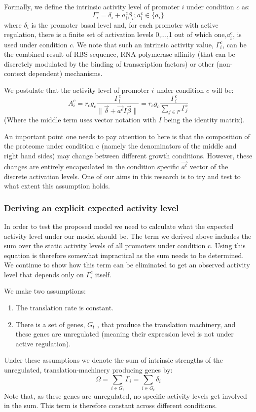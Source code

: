 \documentclass{report}
\providecommand{\norm}[1]{\lVert#1\rVert}
\begin{document}
Formally, we define the intrinsic activity level of promoter $i$ under condition $c$ as:
\[\Gamma^c_i=\delta_i+a^c_i\beta_i ; a^c_i\in \{a_i\}\]
where $\delta_i$ is the promoter basal level and, for each promoter with active regulation, there is a finite set of activation levels {0,...,1} out of which one,$a^c_i$, is used under condition $c$.
We note that such an intrinsic activity value, $\Gamma^c_i$, can be the combined result of RBS-sequence, RNA-polymerase affinity (that can be discretely modulated by the binding of transcription factors) or other (non-context dependent) mechanisms.

We postulate that the activity level of promoter $i$ under condition $c$ will be:
\begin{equation}
\label{cond-act}
A^c_i=r_cg_c\frac{\Gamma^c_i}{\norm{\vec{\delta}+\vec{a^c}I\vec{\beta}}}=r_cg_c\frac{\Gamma^c_i}{\sum_{j\in P}\Gamma^c_j}
\end{equation}
(Where the middle term uses vector notation with $I$ being the identity matrix).

An important point one needs to pay attention to here is that the composition of the proteome under condition c (namely the denominators of the middle and right hand sides) may change between different growth conditions.
However, these changes are entirely encapsulated in the condition specific $\vec{a^c}$ vector of the discrete activation levels.
One of our aims in this research is to try and test to what extent this assumption holds.
\subsubsection{Deriving an explicit expected activity level}
In order to test the proposed model we need to calculate what the expected activity level under our model should be.
The term we derived above includes the sum over the static activity levels of all promoters under condition c.
Using this equation is therefore somewhat impractical as the sum needs to be determined.
We continue to show how this term can be eliminated to get an observed activity level that depends only on $\Gamma^c_i$ itself.

We make two assumptions:
\begin{enumerate}
\item The translation rate is constant.
\item There is a set of genes, $G_t$ , that produce the translation machinery, and these genes are unregulated (meaning their expression level is not under active regulation).
\end{enumerate}
Under these assumptions we denote the sum of intrinsic strengths of the unregulated, translation-machinery producing genes by:
\[\Omega=\sum_{i \in G_t}\Gamma_i=\sum_{i \in G_t}\delta_i\]
Note that, as these genes are unregulated, no specific activity levels get involved in the sum.
This term is therefore constant across different conditions.
\end{document}
